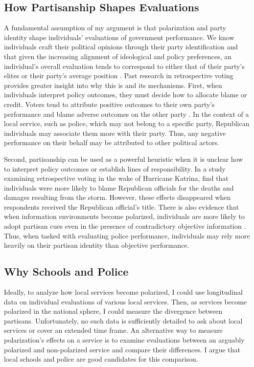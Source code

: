 \subsection{How Partisanship Shapes Evaluations}
A fundamental assumption of my argument is that polarization and party identity shape individuals' evaluations of government performance. We know individuals craft their political opinions through their party identification \citep{campbellAmericanVoter1980,zallerjohnNatureOriginsMass1992} and that given the increasing alignment of ideological and policy preferences, an individual's overall evaluation tends to correspond to either that of their party's elites or their party's average position \citep{lenzLearningOpinionChange2009,sinclair2006party}. Past research in retrospective voting provides greater insight into why this is and its mechanisms. First, when individuals interpret policy outcomes, they must decide how to allocate blame or credit. Voters tend to attribute positive outcomes to their own party's performance and blame adverse outcomes on the other party \citep{healyRetrospectiveVotingReconsidered2013}. In the context of a local service, such as police, which may not belong to a specific party, Republican individuals may associate them more with their party. Thus, any negative performance on their behalf may be attributed to other political actors.

Second, partisanship can be used as a powerful heuristic when it is unclear how to interpret policy outcomes or establish lines of responsibility. In a study examining retrospective voting in the wake of Hurricane Katrina, \citet{malhotraAttributingBlamePublic2008} find that individuals were more likely to blame Republican officials for the deaths and damages resulting from the storm. However, these effects disappeared when respondents received the Republican official's title. There is also evidence that when information environments become polarized, individuals are more likely to adopt partisan cues even in the presence of contradictory objective information \citep{druckmanHowElitePartisan2013}. Thus, when tasked with evaluating police performance, individuals may rely more heavily on their partisan identity than objective performance. 


\subsection{Why Schools and Police}
Ideally, to analyze how local services become polarized, I could use longitudinal data on individual evaluations of various local services. Then, as services become polarized in the national sphere, I could measure the divergence between partisans. Unfortunately, no such data is sufficiently detailed to ask about local services or cover an extended time frame. An alternative way to measure polarization's effects on a service is to examine evaluations between an arguably polarized and non-polarized service and compare their differences. I argue that local schools and police are good candidates for this comparison.


